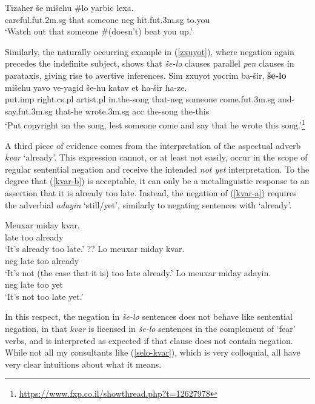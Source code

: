 \documentclass[output=paper,colorlinks,citecolor=brown]{langscibook}
\begin{document}
\ea
\label{tizaher}
\gll Tizaher še mišehu \#{\op}lo{\cp} yarbic lexa. \\
careful.{\sc fut.2m.sg} that someone {\sc neg} hit.{\sc fut.3m.sg} to.you \\
\glt `Watch out that someone \#(doesn't) beat you up.'
\z

Similarly, the naturally occurring example in  (\ref{zxuyot}), where negation again precedes the indefinite subject, shows that \textit{še-lo} clauses parallel \textit{pen} clauses in parataxis, giving rise to avertive inferences.
\ea
\label{zxuyot}
\gll Sim zxuyot yocrim ba-šir, \textbf{še-lo} mišehu yavo ve-yagid še-hu katav et ha-šir ha-ze. \\
put.{\sc imp} right.{\sc cs.pl} artist.{\sc pl} in.the-song that-{\sc neg} someone come.{\sc fut.3m.sg} and-say.{\sc fut.3m.sg} that-he wrote.{\sc 3m.sg} {\sc acc} the-song the-this  \\
\glt `Put copyright on the song, lest someone come and say that he wrote this song.'\footnote{\url{https://www.fxp.co.il/showthread.php?t=12627978}}
\z

A third piece of evidence comes from the interpretation of the aspectual adverb  \textit{kvar} `already'. This expression cannot, or at least not easily, occur in the scope of regular sentential negation and receive the intended \textit{not yet} interpretation. To the degree that (\ref{kvar-b}) is acceptable, it can only be a metalinguistic response to an assertion that it is already too late. Instead, the negation of (\ref{kvar-a}) requires the adverbial \textit{adayin} `still/yet', similarly to negating  sentences with `already'. 

\ea
\label{kvar}
\begin{xlist}
\ex \label{kvar-a}
\gll Meuxar miday kvar. \\
 late too already \\

\glt `It's already too late.'
\ex \label{kvar-b}
\gll ?? Lo meuxar miday kvar. \\
{\phantom{??}} {\sc neg} late too already \\

\glt `It's not (the case that it is) too late already.'
\ex
\gll Lo meuxar miday adayin. \\
 {\sc neg} late too yet \\
\glt `It's not too late yet.'
\end{xlist}
\z

In this respect, the negation in \textit{še-lo} sentences does not behave like sentential negation, in that \textit{kvar} is licensed in \textit{še-lo} sentences in the complement of `fear' verbs, and is interpreted as expected if that clause does not contain negation. While not all my consultants like (\ref{selo-kvar}), which is very colloquial, all have very clear intuitions about what it means.
\end{document}

